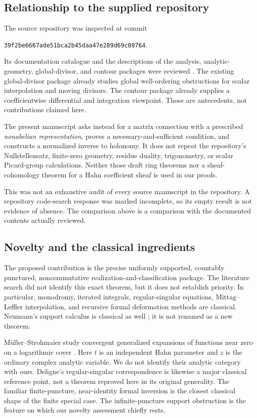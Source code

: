 \documentclass[11pt,letterpaper]{article}
\numberwithin{equation}{section}
\theoremstyle{definition}
\theoremstyle{remark}
\newcommand{\commit}{\texttt{39f2be6667ade51bca2b45daa47e289d69c09764}}
\begin{document}
\subsection{Relationship to the supplied repository}
The source repository was inspected at commit
\begin{center}\small\commit.\end{center}
Its documentation catalogue and the descriptions of the analysis,
analytic-geometry, global-divisor, and contour packages were reviewed
\cite{repo-catalogue,repo-analysis,repo-geometry,repo-global,repo-contours}.
The existing global-divisor package already studies global well-ordering
obstructions for scalar interpolation and moving divisors. The contour
package already supplies a coefficientwise differential and integration
viewpoint. Those are antecedents, not contributions claimed here.

The present manuscript asks instead for a matrix connection with a prescribed
\emph{nonabelian representation}, proves a necessary-and-sufficient condition,
and constructs a normalized inverse to holonomy. It does not repeat the
repository's Nullstellensatz, finite-zero geometry, residue duality,
trigonometry, or scalar Picard-group calculations. Neither those draft ring
theorems nor a sheaf-cohomology theorem for a Hahn coefficient sheaf is used
in our proofs.

This was not an exhaustive audit of every source manuscript in the
repository. A repository code-search response was marked incomplete, so its
empty result is not evidence of absence. The comparison above is a comparison
with the documented contents actually reviewed.

\subsection{Novelty and the classical ingredients}
The proposed contribution is the precise uniformly supported, countably
punctured, noncommutative realization-and-classification package. The
literature search did not identify this exact theorem, but it does not
establish priority. In particular, monodromy, iterated integrals,
regular-singular equations, Mittag--Leffler interpolation, and recursive
formal deformation methods are classical. Neumann's support calculus is
classical as well \cite{neumann,poonen}; it is not renamed as a new theorem.

M\"uller--Strohmaier study convergent generalized expansions of functions near
zero on a logarithmic cover \cite{muller}. Here $t$ is an independent Hahn
parameter and $z$ is the ordinary complex analytic variable. We do not
identify their analytic category with ours. Deligne's regular-singular
correspondence \cite{deligne} is likewise a major classical reference point,
not a theorem reproved here in its original generality. The familiar
finite-puncture, near-identity formal inversion is the closest classical
shape of the finite special case. The infinite-puncture support obstruction
is the feature on which our novelty assessment chiefly rests.
\end{document}
